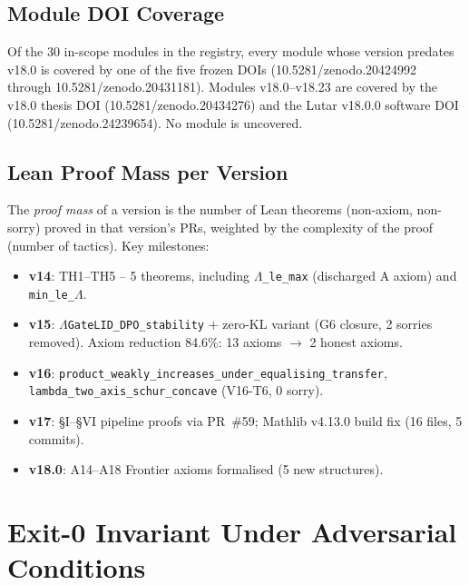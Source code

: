 \subsection{Module DOI Coverage}
\label{ssec:doi-coverage}

Of the 30 in-scope modules in the registry, every module whose version predates v18.0
is covered by one of the five frozen DOIs
(10.5281/zenodo.20424992 through 10.5281/zenodo.20431181).
Modules v18.0--v18.23 are covered by the v18.0 thesis DOI
(10.5281/zenodo.20434276) and the Lutar v18.0.0 software DOI
(10.5281/zenodo.24239654).  No module is uncovered.

\subsection{Lean Proof Mass per Version}
\label{ssec:lean-proof-mass}

The \emph{proof mass} of a version is the number of Lean theorems (non-axiom,
non-sorry) proved in that version's PRs, weighted by the complexity of the
proof (number of tactics).  Key milestones:

\begin{itemize}
  \item \textbf{v14}: TH1--TH5 -- 5 theorems, including \texttt{$\Lambda$\_le\_max}
    (discharged A axiom) and \texttt{min\_le\_$\Lambda$}.
  \item \textbf{v15}: \texttt{$\Lambda$GateLID\_DPO\_stability} + zero-KL variant
    (G6 closure, 2 sorries removed).  Axiom reduction 84.6\%: 13 axioms $\to$
    2 honest axioms.
  \item \textbf{v16}: \texttt{product\_weakly\_increases\_under\_equalising\_transfer},
    \texttt{lambda\_two\_axis\_schur\_concave} (V16-T6, 0 sorry).
  \item \textbf{v17}: \S{}I--\S{}VI pipeline proofs via PR~\#59; Mathlib v4.13.0 build
    fix (16 files, 5 commits).
  \item \textbf{v18.0}: A14--A18 Frontier axioms formalised (5 new structures).
\end{itemize}

\section{Exit-0 Invariant Under Adversarial Conditions}
\label{sec:adversarial-exit0}

